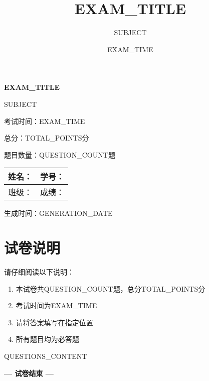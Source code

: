 \documentclass{article}
\title{{EXAM_TITLE}}
\author{{SUBJECT}}
\date{{EXAM_TIME}}
\begin{document}
\begin{titlepage}
    \centering
    \vspace*{2cm}
    
    {\Huge\bfseries {{EXAM_TITLE}} \par}
    \vspace{1cm}
    
    {\Large {{SUBJECT}} \par}
    \vspace{0.5cm}
    
    {\large 考试时间：{{EXAM_TIME}} \par}
    \vspace{0.5cm}
    
    {\large 总分：{{TOTAL_POINTS}}分 \par}
    \vspace{0.5cm}
    
    {\large 题目数量：{{QUESTION_COUNT}}题 \par}
    \vspace{2cm}
    
    \begin{tabular}{|l|l|}
    \hline
    姓名： & 学号： \\
    \hline
    班级： & 成绩： \\
    \hline
    \end{tabular}
    
    \vfill
    
    {\large 生成时间：{{GENERATION_DATE}} \par}
\end{titlepage}

\section*{试卷说明}
请仔细阅读以下说明：
\begin{enumerate}
    \item 本试卷共{{QUESTION_COUNT}}题，总分{{TOTAL_POINTS}}分
    \item 考试时间为{{EXAM_TIME}}
    \item 请将答案填写在指定位置
    \item 所有题目均为必答题
\end{enumerate}

{{QUESTIONS_CONTENT}}

\vspace{1cm}
\centering
\textbf{--- 试卷结束 ---}
\end{document}
